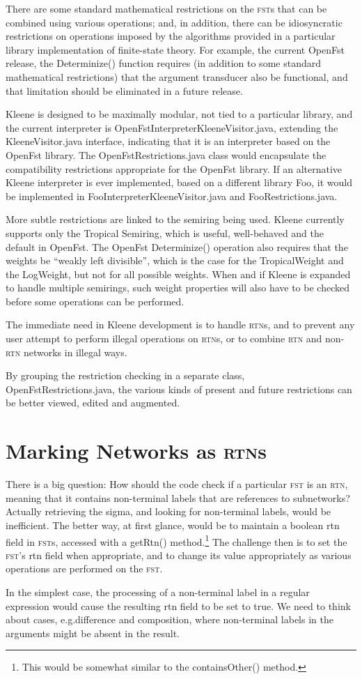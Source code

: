 \documentclass[letterpaper,12pt]{article}
\providecommand{\acro}{}\renewcommand{\acro}{\textsc}
\begin{document}
There are some standard mathematical restrictions on the \acro{fst}s that can be combined
using various operations; and, in addition, there can be idiosyncratic restrictions
on operations imposed by the algorithms provided in a particular library
implementation of finite-state theory.  For example, the current OpenFst release,
the Determinize() function requires (in addition to some standard mathematical restrictions) 
that the argument transducer also be functional,
and that limitation should be eliminated in a future release.

Kleene is designed to be maximally modular, not tied to a particular library, and
the current interpreter is OpenFstInterpreterKleeneVisitor.java, extending the
KleeneVisitor.java interface, indicating that it is an interpreter based on the OpenFst
library.  The OpenFstRestrictions.java class would encapsulate the compatibility
restrictions appropriate for the OpenFst library.  If an alternative Kleene interpreter is
ever implemented, based on a different library Foo, it would be implemented in
FooInterpreterKleeneVisitor.java and FooRestrictions.java.

More subtle restrictions are linked to the semiring being used.  Kleene currently
supports only the Tropical Semiring, which is useful, well-behaved and the default
in OpenFst.  The OpenFst Determinize() operation also requires that the weights be
``weakly left divisible'', which is the case for the TropicalWeight and the
LogWeight, but not for all possible weights.  When and if Kleene is expanded to
handle multiple semirings, such weight properties will also have to be checked
before some operations can be performed.

The immediate need in Kleene development is to handle \acro{rtn}s, and to prevent any user
attempt to perform illegal operations on \acro{rtn}s, or to combine \acro{rtn} and
non-\acro{rtn}
networks in illegal ways.

By grouping the restriction checking in a separate class, OpenFstRestrictions.java,
the various kinds of present and future restrictions can be better viewed, edited
and augmented.

\section{Marking Networks as \acro{rtn}s}

There is a big question:  How should the code check if a particular \acro{fst} is an
\acro{rtn},
meaning that it contains non-terminal labels that are references to subnetworks?
Actually retrieving the sigma, and looking for non-terminal labels, would be
inefficient.  The better way, at first glance, would be to maintain a boolean rtn field
in \acro{fst}s, accessed with a getRtn() method.\footnote{This would be somewhat similar
to the containsOther() method.}  The challenge then is to set the \acro{fst}'s rtn
field when appropriate, and to change its value appropriately as various operations
are performed on the \acro{fst}.

In the simplest case, the processing of a non-terminal label in a regular
expression would cause the resulting rtn
field to be set to true.  We need to think about cases, e.g.\@ difference and
composition, where non-terminal labels in the arguments might be absent in the
result.
\end{document}
